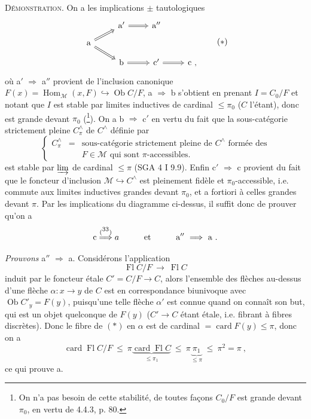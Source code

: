 \documentclass[11pt]{article}
\newcommand{\printedpage}[1]{\marginpar{\footnotesize p.~#1}}
\newcommand{\msp}[1]{\marginpar{\footnotesize [#1]}}
\newcommand{\card}{\operatorname{card}}
\newcommand{\Fl}{\operatorname{Fl}}
\newcommand{\Ob}{\operatorname{Ob}}
\newcommand{\Hom}{\operatorname{Hom}}
\begin{document}
\textsc{Démonstration}. On a les implications $\pm$ tautologiques
\[
\begin{tikzcd}[row sep=small]
 & \mathrm{a}' \arrow[r, Rightarrow] & \mathrm{a}'' & \\
\mathrm{a} \arrow[ur, Rightarrow] \arrow[dr, Rightarrow] & & & \\
 & \mathrm{b} \arrow[r, Rightarrow] & \mathrm{c}' \arrow[r, Rightarrow] & \mathrm{c}\ ,
\end{tikzcd}
\tag*{$(*)$}
\]
\printedpage{30}
où a$'$ $\Longrightarrow$ a$''$ provient de l'inclusion canonique $F(x) = \Hom_{\mathcal{M}}(x,F) \hookrightarrow \Ob C/F$, a $\Longrightarrow$ b s'obtient en prenant $I = C_0/F$ et notant que $I$ est stable par limites inductives de cardinal $\leqslant \pi_0$ ($C$ l'étant), donc est grande devant $\pi_0$ (\footnote{On n'a pas besoin de cette stabilité, de toutes façons $C_0/F$ est grande devant $\pi_0$, en vertu de 4.4.3, p. 80.}). On a b $\Longrightarrow$ c$'$ en vertu du fait que la sous-catégorie strictement pleine $C^{\wedge}_{\pi}$ de $C^{\wedge}$ définie par
\[
\left\{
\begin{array}{lcl}
C^{\wedge}_{\pi} & = & \text{sous-catégorie strictement pleine de } C^{\wedge} \text{ formée des}\\
 & & F \in \mathcal{M} \text{ qui sont } \pi\text{-accessibles.}
\end{array}
\right.
\tag*{(4.5.2.2)}
\]
est stable par $\varinjlim$ de cardinal $\leqslant \pi$ (SGA 4 I 9.9). Enfin c$'$ $\Longrightarrow$ c provient du fait que le foncteur d'inclusion $\mathcal{M} \hookrightarrow C^{\wedge}$ est pleinement fidèle et $\pi_0$-accessible, i.e. commute aux limites inductives grandes devant $\pi_0$, et a fortiori à celles grandes devant $\pi$. Par les implications du diagramme ci-dessus, il suffit donc de prouver qu'on a
\[
\mathrm{c} \overset{(\mbox{\footnotemark[33]})}{\Longrightarrow} a \qquad\quad \text{et} \qquad\quad \mathrm{a}'' \ \Longrightarrow\ \mathrm{a}\ .
\]
\setcounter{footnote}{33}

\msp{page 109}

\textit{Prouvons} a$''$ $\Longrightarrow$ a. Considérons l'application
\[
\Fl C/F \ \longrightarrow\ \Fl C
\tag*{$(*)$}
\]
induit par le foncteur étale $C' = C/F \longrightarrow C$, alors l'ensemble des flèches au-dessus d'une %
flèche $\alpha : x \longrightarrow y$ de $C$ est en correspondance biunivoque avec $\Ob C'_y = F(y)$, puisqu'une telle flèche $\alpha'$ est connue quand on connaît son but, qui est un objet quelconque de $F(y)$ ($C' \longrightarrow C$ étant étale, i.e. fibrant à fibres discrètes). Donc le fibre de $(*)$ en $\alpha$ est de %
cardinal $= \card F(y) \leqslant \pi$, donc on a
\[
\card\Fl C/F \ \leqslant\ \pi \underbrace{\card\Fl C}_{\leqslant \pi_1} \ \leqslant\ \pi \underbrace{\ \pi_1\ }_{\leqslant \pi} \ \leqslant\ \pi^2 = \pi\ ,
\]
ce qui prouve a.
\end{document}
